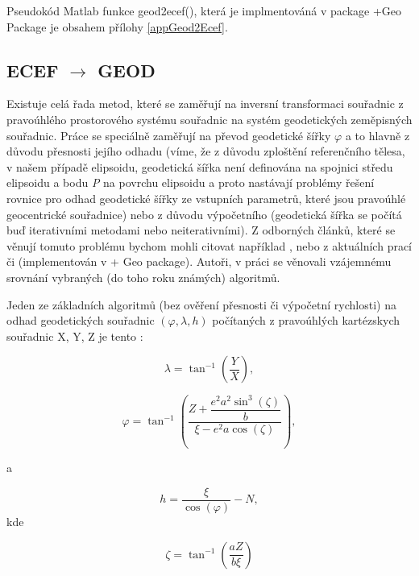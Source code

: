 Pseudokód Matlab funkce geod2ecef(), která je implmentováná v package +Geo Package je obsahem přílohy \ref{appGeod2Ecef}.


\subsection{ECEF $\rightarrow$ GEOD}

Existuje celá řada metod, které se zaměřují na inversní transformaci souřadnic z pravoúhlého prostorového systému souřadnic na systém geodetických zeměpisných souřadnic. Práce se speciálně zaměřují na převod geodetické šířky $\varphi$ a to hlavně z důvodu přesnosti jejího odhadu (víme, že z důvodu zploštění referenčního tělesa, v našem případě elipsoidu, geodetická šířka není definována na spojnici středu elipsoidu a bodu \textit{P} na povrchu elipsoidu a proto nastávají problémy řešení rovnice pro odhad geodetické šířky ze vstupních parametrů, které jsou pravoúhlé geocentrické souřadnice) nebo z důvodu výpočetního (geodetická šířka se počítá buď iterativními metodami nebo neiterativními). Z odborných článků, které se věnují tomuto problému bychom mohli citovat například \cite{Bowring1976}, \cite{Borkowski1989} nebo z aktuálních prací \cite{Fukushima2006} či \cite{Vermeille2011} (implementován v + Geo package). Autoři, v práci \cite{Fok2003} se věnovali vzájemnému srovnání vybraných (do toho roku známých) algoritmů.

Jeden ze základních algoritmů (bez ověření přesnosti či výpočetní rychlosti) na odhad geodetických souřadnic $ \left(\varphi, \lambda, h \right)$ počítaných z pravoúhlých kartézskych souřadnic X, Y, Z je tento \cite{Grewal2001}:


\begin{equation}
\lambda = \tan^{-1}{\left(\dfrac{Y}{X}\right)},
\end{equation} 

\begin{equation}
\varphi = \tan^{-1}{\left(\dfrac{Z+\dfrac{e^{2}a^{2}\sin^{3}{\left(\zeta\right)}}{b}}{\xi-e^{2}a\cos{\left(\zeta\right)}}\right)},
\end{equation} 

a

\begin{equation}
h = \dfrac{\xi}{\cos{\left(\varphi\right)}} - N,
\end{equation}
kde

\begin{equation}
\zeta = \tan^{-1}{\left(\dfrac{aZ}{b\xi}\right)}
\end{equation}

